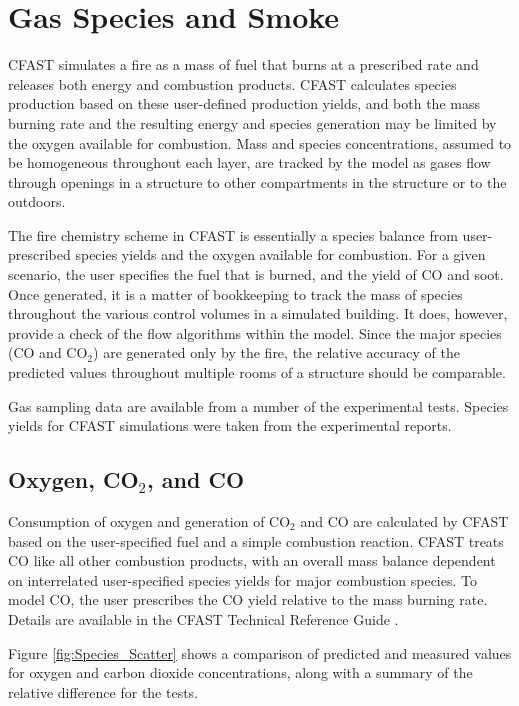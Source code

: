 
\chapter{Gas Species and Smoke}

CFAST simulates a fire as a mass of fuel that burns at a prescribed rate and releases both energy and combustion products.  CFAST calculates species production based on these user-defined production yields, and both the mass burning rate and the resulting energy and species generation may be limited by the oxygen available for combustion.  Mass and species concentrations, assumed to be homogeneous throughout each layer, are tracked by the model as gases flow through openings in a structure to other compartments in the structure or to the outdoors.

The fire chemistry scheme in CFAST is essentially a species balance from user-prescribed species yields and the oxygen available for combustion.  For a given scenario, the user specifies the fuel that is burned, and the yield of CO and soot. Once generated, it is a matter of bookkeeping to track the mass of species throughout the various control volumes in a simulated building.  It does, however, provide a check of the flow algorithms within the model. Since the major species (CO and CO$_2$) are generated only by the fire, the relative accuracy of the predicted values throughout multiple rooms of a structure should be comparable.

Gas sampling data are available from a number of the experimental tests. Species yields for CFAST simulations were taken from the experimental reports.

\section{Oxygen, CO$_2$, and CO}

Consumption of oxygen and generation of CO$_2$ and CO are calculated by CFAST based on the user-specified fuel and a simple combustion reaction. CFAST treats CO like all other combustion products, with an overall mass balance dependent on interrelated user-specified species yields for major combustion species. To model CO, the user prescribes the CO yield relative to the mass burning rate. Details are available in the CFAST Technical Reference Guide \cite{CFAST_Tech_Guide_8}.

Figure \ref{fig:Species_Scatter} shows a comparison of predicted and measured values for oxygen and carbon dioxide concentrations, along with a summary of the relative difference for the tests.
\label{Oxygen Concentration}
\label{Carbon Dioxide Concentration}
\label{Carbon Monoxide Concentration}

